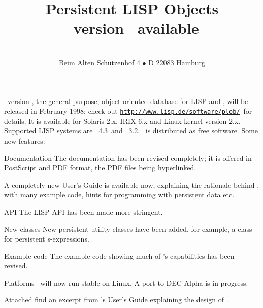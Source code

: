 
\def\NoOfSides{twoside}%
\def\WideOption{12pt}%
\def\ClassName{article}
\def\thistitle{version \thisversion\ available}
\def\thispartnumber{}
%

\addtolength\textwidth      {20mm}%
\addtolength\evensidemargin {-20mm}%
\addtolength\textheight     {16.10072mm}%



\pagestyle{empty}
\thispagestyle{empty}

\title{\ifx\avb\undefined\relax\else\avb\fi%
Persistent LISP Objects\\
\plob\ \thistitle}
\author{\thisauthor\\%
\normalsize Beim Alten Sch\"{u}tzenhof 4 $\bullet$ %
D 22083 Hamburg}%
\maketitle
\pagestyle{empty}
\thispagestyle{empty}

\noindent\plob\ version \thisversion, the general purpose,
object-oriented database for LISP and \clos, will be released in
February 1998; check out
\texttt{{\small\url{http://www.lisp.de/software/plob/}}}\ for details.
It is available for Solaris 2.x, IRIX 6.x and Linux kernel version
2.x. Supported LISP systems are \allegrocl\ 4.3\ and \lwcl\ 3.2.
\plob\ is distributed as free software.
Some new features:
\begin{deflist}[Documentation]

\item[Documentation] The documentation has been revised completely; it
  is offered in PostScript and PDF format, the PDF files being
  hyperlinked.

  A completely new User's Guide is available now, explaining the
  rationale behind \plob, with many example code, hints for
  programming with persistent data etc.

\item[API] The LISP API has been made more stringent.

\item[New classes] New persistent utility classes have been added, for
  example, a class for persistent s-expressions.

\item[Example code] The example code showing much of \plob's
  capabilities has been revised.

\item[Platforms] \plob\ will now run stable on Linux. A port to DEC
  Alpha is in progress.

\end{deflist}

\noindent Attached find an excerpt from \plobwoexcl's User's Guide
  explaining the design of \plobwoexcl.

\cleardoublepage

